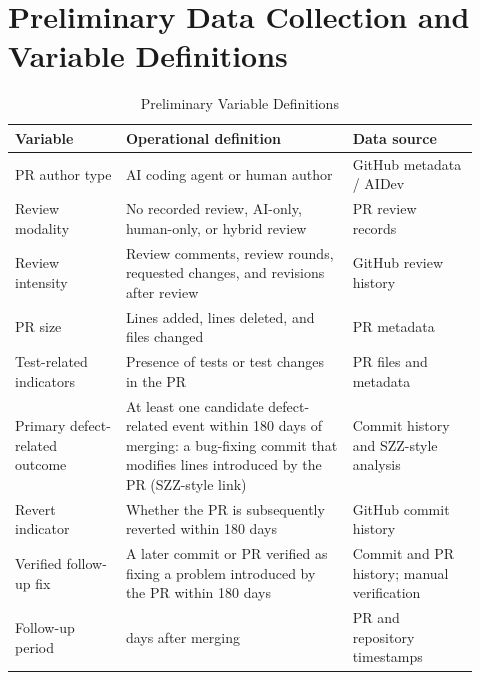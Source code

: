 \documentclass[stu,12pt,donotrepeattitle]{apa7}
\begin{document}
\printbibliography[title={References}]

\appendix

\section{Preliminary Data Collection and Variable Definitions}

\begin{table}[ht]
\caption{Preliminary Variable Definitions}
\label{tab:variables}
\small
\begin{tabular}{@{}>{\raggedright\arraybackslash}p{0.22\linewidth}>{\raggedright\arraybackslash}p{0.45\linewidth}>{\raggedright\arraybackslash}p{0.25\linewidth}@{}}
\toprule
Variable & Operational definition & Data source \\
\midrule
PR author type & AI coding agent or human author & GitHub metadata / AIDev \\
Review modality & No recorded review, AI-only, human-only, or hybrid review & PR review records \\
Review intensity & Review comments, review rounds, requested changes, and revisions after review & GitHub review history \\
PR size & Lines added, lines deleted, and files changed & PR metadata \\
Test-related indicators & Presence of tests or test changes in the PR & PR files and metadata \\
Primary defect-related outcome & At least one candidate defect-related event within 180 days of merging: a bug-fixing commit that modifies lines introduced by the PR (SZZ-style link) & Commit history and SZZ-style analysis \\
Revert indicator & Whether the PR is subsequently reverted within 180 days & GitHub commit history \\
Verified follow-up fix & A later commit or PR verified as fixing a problem introduced by the PR within 180 days & Commit and PR history; manual verification \\
Follow-up period & 180 days after merging & PR and repository timestamps \\
\bottomrule
\end{tabular}
\end{table}
\end{document}
